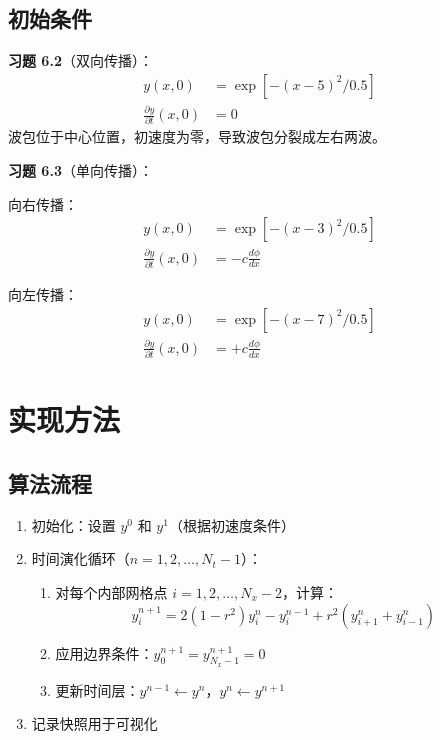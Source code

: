 \documentclass[12pt,a4paper]{article}
\begin{document}
\subsection{初始条件}

\textbf{习题 6.2}（双向传播）：
\begin{align}
y(x, 0) &= \exp[-(x-5)^2/0.5] \\
\frac{\partial y}{\partial t}(x, 0) &= 0
\end{align}
波包位于中心位置，初速度为零，导致波包分裂成左右两波。

\textbf{习题 6.3}（单向传播）：

向右传播：
\begin{align}
y(x, 0) &= \exp[-(x-3)^2/0.5] \\
\frac{\partial y}{\partial t}(x, 0) &= -c\frac{d\phi}{dx}
\end{align}

向左传播：
\begin{align}
y(x, 0) &= \exp[-(x-7)^2/0.5] \\
\frac{\partial y}{\partial t}(x, 0) &= +c\frac{d\phi}{dx}
\end{align}

\section{实现方法}

\subsection{算法流程}

\begin{enumerate}
    \item 初始化：设置 $y^0$ 和 $y^1$（根据初速度条件）
    \item 时间演化循环（$n = 1, 2, \ldots, N_t-1$）：
    \begin{enumerate}
        \item 对每个内部网格点 $i = 1, 2, \ldots, N_x-2$，计算：
        \begin{equation*}
        y_i^{n+1} = 2(1-r^2)y_i^n - y_i^{n-1} + r^2(y_{i+1}^n + y_{i-1}^n)
        \end{equation*}
        \item 应用边界条件：$y_0^{n+1} = y_{N_x-1}^{n+1} = 0$
        \item 更新时间层：$y^{n-1} \leftarrow y^n$，$y^n \leftarrow y^{n+1}$
    \end{enumerate}
    \item 记录快照用于可视化
\end{enumerate}
\end{document}

